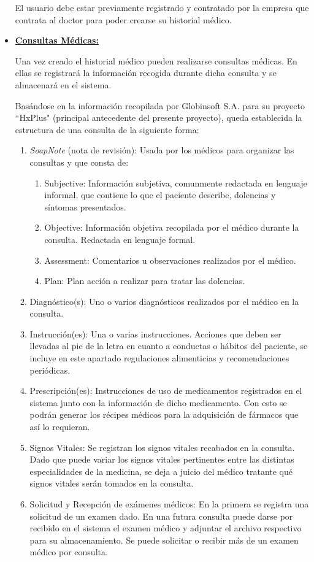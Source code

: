 \begin{itemize}
        El usuario debe estar previamente registrado y contratado por la empresa que contrata al doctor para poder crearse su historial médico.
        
        \item \textbf{\underline{Consultas Médicas:}}
        \label{consultas-datos}
        
        Una vez creado el historial médico pueden realizarse consultas médicas. En ellas se registrará la información recogida durante dicha consulta y se almacenará en el sistema.
        
        Basándose en la información recopilada por Globinsoft S.A. para su proyecto ``HxPlus" (principal antecedente del presente proyecto), queda establecida la estructura de una consulta de la siguiente forma:
        
        \begin{enumerate}
            \item \textit{SoapNote} (nota de revisión): Usada por los médicos para organizar las consultas y que consta de:
            \begin{enumerate}
                \item Subjective: Información subjetiva, comunmente redactada en lenguaje informal, que contiene lo que el paciente describe, dolencias y síntomas presentados.
                \item Objective: Información objetiva recopilada por el médico durante la consulta. Redactada en lenguaje formal.
                \item Assessment: Comentarios u observaciones realizados por el médico.
                \item Plan: Plan acción a realizar para tratar las dolencias.
            \end{enumerate}
            \item Diagnóstico(s): Uno o varios diagnósticos realizados por el médico en la consulta.
            \item Instrucción(es): Una o varias instrucciones. Acciones que deben ser llevadas al pie de la letra en cuanto a conductas o hábitos del paciente, se incluye en este apartado regulaciones alimenticias y recomendaciones periódicas.
            \item Prescripción(es): Instrucciones de uso de medicamentos registrados en el sistema junto con la información de dicho medicamento. Con esto se podrán generar los récipes médicos para la adquisición de fármacos que así lo requieran.
            \item Signos Vitales: Se registran los signos vitales recabados en la consulta. Dado que puede variar los signos vitales pertinentes entre las distintas especialidades de la medicina, se deja a juicio del médico tratante qué signos vitales serán tomados en la consulta.
            \item Solicitud y Recepción de exámenes médicos: En la primera se registra una solicitud de un examen dado. En una futura consulta puede darse por recibido en el sistema el examen médico y adjuntar el archivo respectivo para su almacenamiento. Se puede solicitar o recibir más de un examen médico por consulta.
        \end{enumerate}
        

\end{itemize}
